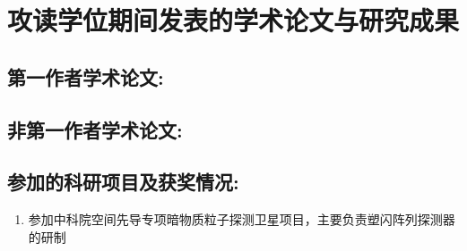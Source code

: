 \chapter*{攻读学位期间发表的学术论文与研究成果}




\section*{第一作者学术论文:}
\begin{refsection}
\nocite{*}

\printbibliography[heading=none,keyword={own-first}]
\end{refsection}

\section*{非第一作者学术论文:}

\begin{refsection}
\nocite{*}
\printbibliography[heading=none,keyword={own-related}]
\end{refsection}

\section*{参加的科研项目及获奖情况:}
\begin{enumerate}
	\item 参加中科院空间先导专项暗物质粒子探测卫星项目，主要负责塑闪阵列探测器的研制
\end{enumerate}